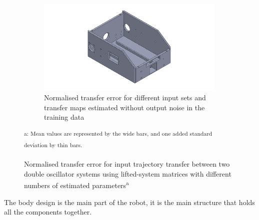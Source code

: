 \begin{figure}[h!]
\begin{subfigure}[t]{1\textwidth}
        \includegraphics[width=0.99\textwidth]{Body_Design_3}
        \caption{Normalised transfer error for different input sets and transfer maps estimated without output noise in the training data}
        \label{subfig:sim1_lsd_results_freq}
    \end{subfigure}
    \caption[Double Oscillator -- Transfer Error (Transfer Matrix)]
    {Normalised transfer error for input trajectory transfer between two double oscillator systems using lifted-system matrices with different numbers of estimated parameters\textsuperscript{\textcolor{note_color}{a}}}
    \raggedright\small\textsuperscript{\hspace{0.132\textwidth}\textcolor{note_color}{a}: Mean values are represented by the wide bars, and one added standard deviation by thin bars.}
    \label{fig:sim1_lsd_results}
\end{figure}
The body design is the main part of the robot, it is the main structure that holds all the components together.


